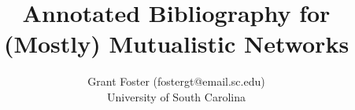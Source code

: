 \documentclass [11pt]{article}
\title{Annotated Bibliography for (Mostly) Mutualistic Networks}
\author{Grant Foster (fostergt@email.sc.edu)\\University of South Carolina}
\begin{document}
\maketitle



\nocite{*}





\end{document}
